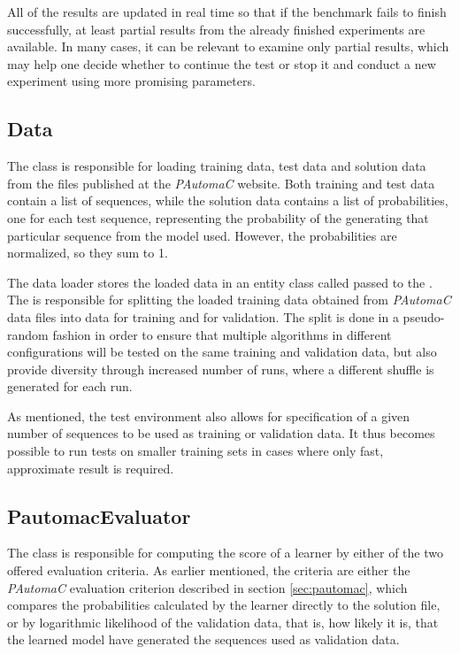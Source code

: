 All of the results are updated in real time so that if the benchmark fails to finish successfully, at least partial results from the already finished experiments are available. In many cases, it can be relevant to examine only partial results, which may help one decide whether to continue the test or stop it and conduct a new experiment using more promising parameters.

\subsection{Data}
The  class is responsible for loading training data, test data and solution data from the files published at the \emph{PAutomaC} website. Both training and test data contain a list of sequences, while the solution data contains a list of probabilities, one for each test sequence, representing the probability of the generating that particular sequence from the model used. However, the probabilities are normalized, so they sum to 1.

The data loader stores the loaded data in an entity class called  passed to the . The  is responsible for splitting the loaded training data obtained from \emph{PAutomaC} data files into data for training and for validation. The split is done in a pseudo-random fashion in order to ensure that multiple algorithms in different configurations will be tested on the same training and validation data, but also provide diversity through increased number of runs, where a different shuffle is generated for each run.

As mentioned, the test environment also allows for specification of a given number of sequences to be used as training or validation data. It thus becomes possible to run tests on smaller training sets in cases where only fast, approximate result is required.

\subsection{PautomacEvaluator}
The  class is responsible for computing the score of a learner by either of the two offered evaluation criteria. As earlier mentioned, the criteria are either the \emph{PAutomaC} evaluation criterion described in section \ref{sec:pautomac}, which compares the probabilities calculated by the learner directly to the solution file, or by logarithmic likelihood of the validation data, that is, how likely it is, that the learned model have generated the sequences used as validation data.

